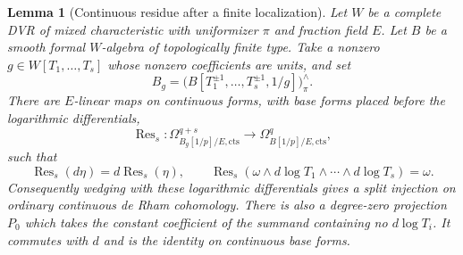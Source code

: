 \documentclass[11pt,a4paper]{article}
\newtheorem{lemma}[theorem]{Lemma}
\theoremstyle{remark}
\begin{document}
\begin{lemma}[Continuous residue after a finite localization]
\label{lem:continuouslaurentresidue}
Let $W$ be a complete DVR of mixed characteristic with uniformizer
$\pi$ and fraction field $E$. Let $B$ be a smooth formal $W$-algebra
of topologically finite type. Take a nonzero
$g\in W[T_1,\ldots,T_s]$ whose nonzero coefficients are units, and set
\[
 B_g=\bigl(B[T_1^{\pm1},\ldots,T_s^{\pm1},1/g]\bigr)^{\wedge}_{\pi}.
\]
There are $E$-linear maps on continuous forms, with base forms
placed before the logarithmic differentials,
\[
 \operatorname{Res}_s:
 \Omega^{q+s}_{B_g[1/p]/E,\mathrm{cts}}
       \longrightarrow\Omega^q_{B[1/p]/E,\mathrm{cts}},
\]
such that
\[
 \operatorname{Res}_s(d\eta)=d\operatorname{Res}_s(\eta),\qquad
 \operatorname{Res}_s\left(
 \omega\wedge d\log T_1\wedge\cdots\wedge d\log T_s\right)=\omega.
\]
Consequently wedging with these logarithmic differentials gives
a split injection on ordinary continuous de Rham cohomology.
There is also a degree-zero projection $P_0$ which takes the
constant coefficient of the summand containing no $d\log T_i$.
It commutes with $d$ and is the identity on continuous base forms.
\end{lemma}
\end{document}
